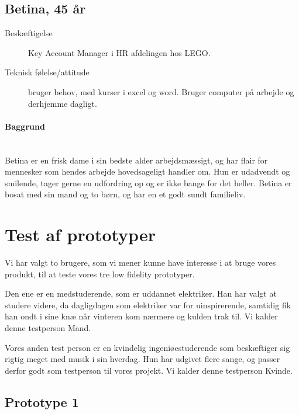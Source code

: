 \documentclass[a4paper,titlepage,fleqn,12pt]{article}
\begin{document}
\subsection{Betina, 45 år}
\begin{description}
	\item[Beskæftigelse] Key Account Manager i HR afdelingen hos LEGO. \item[Teknisk følelse/attitude] bruger behov, med kurser i excel og word. Bruger computer på arbejde og derhjemme dagligt.
\end{description}
\paragraph{Baggrund}\hfill\\
Betina er en frisk dame i sin bedste alder arbejdsmæssigt, og har flair for mennesker som hendes arbejde hovedsageligt handler om. Hun er udadvendt og smilende, tager gerne en udfordring op og er ikke bange for det heller. Betina er bosat med sin mand og to børn, og har en et godt sundt familieliv.

\section{Test af prototyper}

Vi har valgt to brugere, som vi mener kunne have interesse i at bruge vores produkt, til at teste vores tre low fidelity prototyper. 

Den ene er en medstuderende, som er uddannet elektriker. Han har valgt at studere videre, da dagligdagen som elektriker var for uinspirerende, samtidig fik han ondt i sine knæ når vinteren kom nærmere og kulden trak til. Vi kalder denne testperson Mand.

Vores anden test person er en kvindelig ingeniøestuderende som beskæftiger sig rigtig meget med musik i sin hverdag. Hun har udgivet flere sange, og passer derfor godt som testperson til vores projekt. Vi kalder denne testperson Kvinde.


\subsection{Prototype 1}
\end{document}
